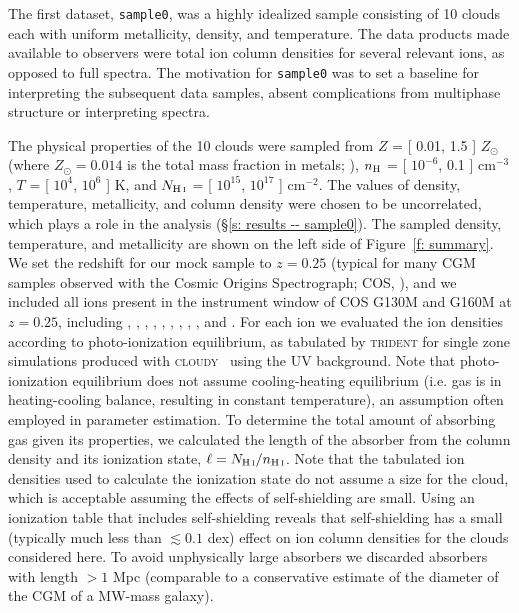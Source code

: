 \documentclass[fleqn,usenatbib]{mnras}
\begin{document}
The first dataset, \texttt{sample0}, was a highly idealized sample consisting of 10 clouds each with uniform metallicity, density, and temperature.
The data products made available to observers were total  ion column densities for several relevant ions, as opposed to full spectra.
The motivation for \texttt{sample0} was to set a baseline for interpreting the subsequent data samples, absent complications from multiphase structure or interpreting spectra.

The physical properties of the 10 clouds were sampled from $Z$ = [ 0.01, 1.5 ] $Z_\odot$ (where $Z_\odot = 0.014$ is the total mass fraction in metals; \citealt{asplund2009Chemical}), $n_{\rm H}$ = [ $10^{-6}$, 0.1 ] cm$^{-3}$, $T$ = [ $10^4$, $10^6$ ] K, and $N_{\ion{H}{I}}$ = [ $10^{15}$, $10^{17}$ ] cm$^{-2}$.
The values of density, temperature, metallicity, and  column density were chosen to be uncorrelated, which plays a role in the analysis (\S\ref{s: results -- sample0}).
The sampled density, temperature, and metallicity are shown on the left side of Figure~\ref{f: summary}.
We set the redshift for our mock sample to $z=0.25$ (typical for many CGM samples observed with the Cosmic Origins Spectrograph; COS, \citealt{green2012COSMIC}), and we included all ions present in the instrument window of COS G130M and G160M at $z=0.25$, including , , , , , , ,  , , and .
For each ion we evaluated the ion densities according to photo-ionization equilibrium, as tabulated by \textsc{trident} for single zone simulations produced with \textsc{cloudy}~\citep{ferland20132013} using the \cite{haardt2012RADIATIVE} UV background.
Note that photo-ionization equilibrium does not assume cooling-heating equilibrium (i.e. gas is in heating-cooling balance, resulting in constant temperature),
an assumption often employed in parameter estimation.
To determine the total amount of absorbing gas given its properties, we calculated the length of the absorber from the  column density and its ionization state, $\ell = N_{\ion{H}{I}} / n_{\ion{H}{I}}$.
Note that the tabulated ion densities used to calculate the ionization state do not assume a size for the cloud, which is acceptable assuming the effects of self-shielding are small.
Using an ionization table that includes self-shielding reveals that self-shielding has a small (typically much less than $\lesssim 0.1$ dex) effect on ion column densities for the clouds considered here.
To avoid unphysically large absorbers we discarded absorbers with length $> 1$ Mpc (comparable to a conservative estimate of the diameter of the CGM of a MW-mass galaxy).
\end{document}
